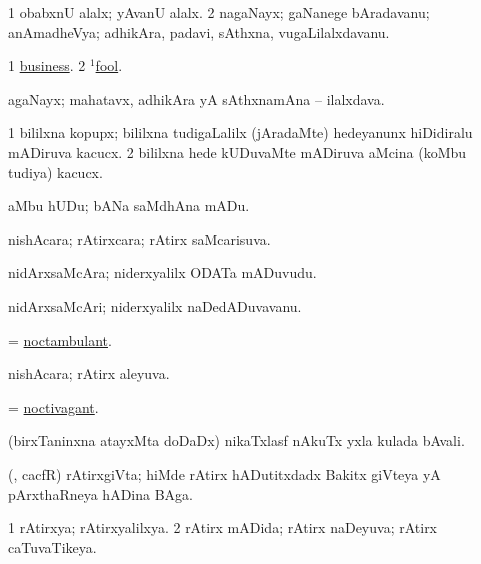 \bentry
{}
\gl{\sanA}
\bmng
\bnum
\num{1} obabxnU alalx; yAvanU alalx. 
\num{2} nagaNayx; gaNanege bAradavanu; anAmadheVya; adhikAra, padavi, sAthxna, \mo vugaLilalxdavanu. 
\enum
\emng

\noindent
\gl{\pagu}
\bmng
\bnum
\num{1}  \hyperref{kandict_b.pdf}{B}{business nuga(7)}{business}. 
\num{2}  \hyperref{kandict_f.pdf}{F}{fool(1) nuga(9)}{$^1$fool}. 
\enum
\emng
\eentry

\bentry
{}
\gl{\nA}
\bmng
agaNayx; mahatavx, adhikAra yA sAthxnamAna -- ilalxdava. 
\emng
\eentry

\bentry
{}
\gl{\nA}
\bmng
\bnum
\num{1} bililxna kopupx; bililxna tudigaLalilx (jAradaMte) hedeyanunx hiDidiralu mADiruva kacucx. 
\num{2} bililxna hede kUDuvaMte mADiruva aMcina (koMbu tudiya) kacucx. 
\enum
\emng
\eentry

\bentry
{}
\gl{\sakirx}
\bmng
aMbu hUDu; bANa saMdhAna mADu. 
\emng
\eentry

\bentry
{}
\gl{\gu}
\bmng
nishAcara; rAtirxcara; rAtirx saMcarisuva. 
\emng
\eentry

\bentry
{}
\gl{\nA}
\bmng
nidArxsaMcAra; niderxyalilx ODATa mADuvudu. 
\emng
\eentry

\bentry
{}
\gl{\nA}
\bmng
nidArxsaMcAri; niderxyalilx naDedADuvavanu. 
\emng
\eentry

\bentry
{}
\gl{\gu}
\bmng
= \hyperlink{noctambulant}{noctambulant}. 
\emng
\eentry

\bentry
{}
\gl{\gu}
\bmng
nishAcara; rAtirx aleyuva. 
\emng
\eentry

\bentry
{}
\gl{\gu}
\bmng
= \hyperlink{noctivagant}{noctivagant}. 
\emng
\eentry

\bentry
{}
\gl{\nA}
\bmng
(birxTaninxna atayxMta doDaDx) nikaTxlasf nAkuTx yxla kulada bAvali. 
\emng
\eentry

\bentry
{}
\gl{\nA}
\bmng
(\roVkAyx, cacfR) rAtirxgiVta; hiMde rAtirx hADutitxdadx Bakitx giVteya yA pArxthaRneya hADina BAga. 
\emng
\eentry

\bentry
{}
\gl{\gu}
\bmng
\bnum
\num{1} rAtirxya; rAtirxyalilxya. 
\num{2} rAtirx mADida; rAtirx naDeyuva; rAtirx caTuvaTikeya. 
\enum
\emng
\eentry

